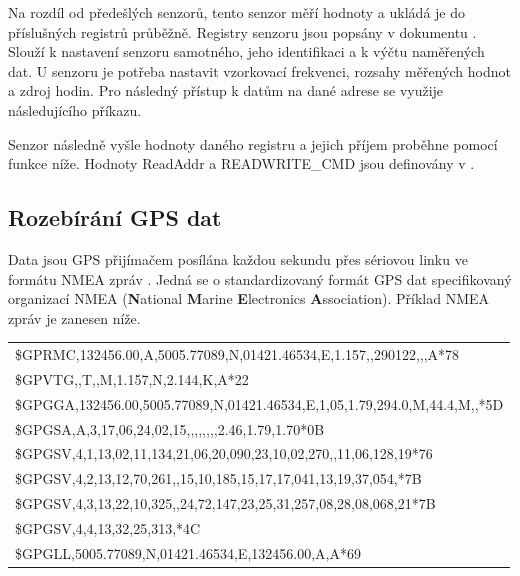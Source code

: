\documentclass[twoside]{ctuthesis}
\theoremstyle{plain}
\theoremstyle{definition}
\theoremstyle{note}
\begin{document}
		Na rozdíl od předešlých senzorů, tento senzor měří hodnoty a ukládá je do příslušných registrů průběžně. Registry senzoru jsou popsány v dokumentu \cite{dsh_mpu_map}. Slouží k nastavení senzoru samotného, jeho identifikaci a k výčtu naměřených dat. U senzoru je potřeba nastavit vzorkovací frekvenci, rozsahy měřených hodnot a zdroj hodin. Pro následný přístup k datům na dané adrese se využije následujícího příkazu.
		
		Senzor následně vyšle hodnoty daného registru a jejich příjem proběhne pomocí funkce níže. Hodnoty ReadAddr a READWRITE\_CMD jsou definovány v \cite{dsh_mpu_map}.
		
		


		\subsection{Rozebírání GPS dat}
		Data jsou GPS přijímačem posílána každou sekundu přes sériovou linku ve formátu NMEA zpráv \cite{nmea}. Jedná se o standardizovaný formát GPS dat specifikovaný organizací NMEA (\textbf{N}ational \textbf{M}arine \textbf{E}lectronics \textbf{A}ssociation). Příklad NMEA zpráv je zanesen níže.
		\begin{table}[h!]
			\centering
			\begin{tabular}{l}
				\$GPRMC,132456.00,A,5005.77089,N,01421.46534,E,1.157,,290122,,,A*78\\
				\$GPVTG,,T,,M,1.157,N,2.144,K,A*22\\
				\$GPGGA,132456.00,5005.77089,N,01421.46534,E,1,05,1.79,294.0,M,44.4,M,,*5D\\
				\$GPGSA,A,3,17,06,24,02,15,,,,,,,,2.46,1.79,1.70*0B\\
				\$GPGSV,4,1,13,02,11,134,21,06,20,090,23,10,02,270,,11,06,128,19*76\\
				\$GPGSV,4,2,13,12,70,261,,15,10,185,15,17,17,041,13,19,37,054,*7B\\
				\$GPGSV,4,3,13,22,10,325,,24,72,147,23,25,31,257,08,28,08,068,21*7B\\
				\$GPGSV,4,4,13,32,25,313,*4C\\
				\$GPGLL,5005.77089,N,01421.46534,E,132456.00,A,A*69\\
			\end{tabular}
		\end{table}
\end{document}

